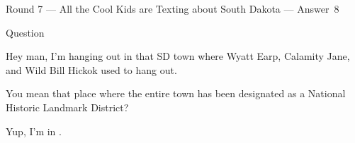 \documentclass[11pt]{beamer}
\begin{document}
\begin{frame}[t]{Round 7 --- All the Cool Kids are Texting about South Dakota --- \mbox{Answer 8}}
\begin{block}{Question}

\begin{minipage}{0.9\textwidth}
\begin{mdframed}[
    roundcorner=7pt,
    backgroundcolor=black!5,
    linecolor=black!5,
    fontcolor=black,
    ignorelastdescenders]
\begin{flushleft}
{\small{}\selectfont{}
Hey man, I'm hanging out in that SD town where Wyatt Earp, Calamity Jane, and Wild Bill Hickok used to hang out.
}
\end{flushleft}
\end{mdframed}
\end{minipage}

\hfill{}\begin{minipage}{0.9\textwidth}
\begin{mdframed}[
    roundcorner=7pt,
    backgroundcolor=blue!80!white,
    linecolor=blue!80!white,
    fontcolor=white,
    ignorelastdescenders]
\begin{flushleft}
{\small{}\selectfont{}
You mean that place where the entire town has been designated as a National Historic Landmark District?
}
\end{flushleft}
\end{mdframed}
\end{minipage}

\begin{minipage}{0.9\textwidth}
\begin{mdframed}[
    roundcorner=7pt,
    backgroundcolor=black!5,
    linecolor=black!5,
    fontcolor=black,
    ignorelastdescenders]
\begin{flushleft}
{\small{}\selectfont{}
Yup, I'm in \textunderscore{}\textunderscore{}\textunderscore{}\textunderscore{}\textunderscore{}\textunderscore{}.
}
\end{flushleft}
\end{mdframed}
\end{minipage}
\end{block}
\end{frame}
\end{document}
